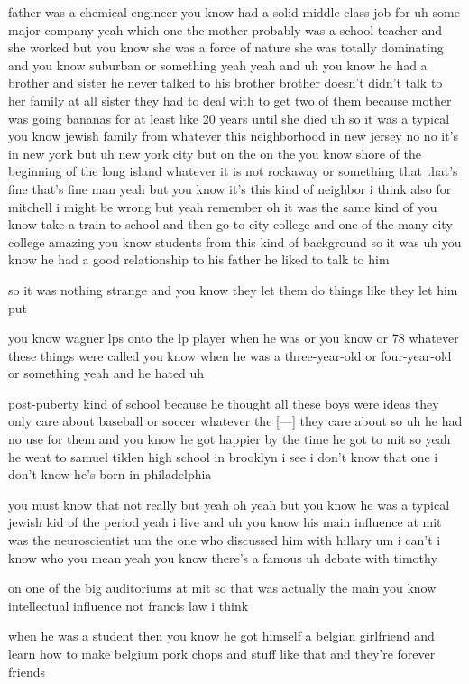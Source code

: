 \begin{description}
father was a chemical engineer you know had a solid middle class job for uh some major company yeah which one the mother probably was a school teacher and she worked but you know she was a force of nature she was totally dominating and you know suburban or something yeah yeah and uh you know he had a brother and sister he never talked to his brother brother doesn't didn't talk to her family at all sister they had to deal with to get two of them because mother was going bananas for at least like 20 years until she died uh so it was a typical you know jewish family from whatever this neighborhood in new jersey no no it's in new york but uh new york city but on the on the you know shore of the beginning of the long island whatever it is not rockaway or something that that's fine that's fine man yeah but you know it's this kind of neighbor i think also for mitchell i might be wrong but yeah remember oh it was the same kind of you know take a train to school and then go to city college and one of the many city college amazing you know students from this kind of background so it was uh you know he had a good relationship to his father he liked to talk to him

so it was nothing strange and you know they let them do things like they let him put

you know wagner lps onto the lp player when he was or you know or 78 whatever these things were called you know when he was a three-year-old or four-year-old or something yeah and he hated uh

post-puberty kind of school because he thought all these boys were ideas they only care about baseball or soccer whatever the [---] they care about so uh he had no use for them and you know he got happier by the time he got to mit so yeah he went to samuel tilden high school in brooklyn i see i don't know that one i don't know he's born in philadelphia

you must know that not really but yeah oh yeah but you know he was a typical jewish kid of the period yeah i live and uh you know his main influence at mit was the neuroscientist um the one who discussed him with hillary um i can't i know who you mean yeah you know there's a famous uh debate with timothy

on one of the big auditoriums at mit so that was actually the main you know intellectual influence not francis law i think

when he was a student then you know he got himself a belgian girlfriend and learn how to make belgium pork chops and stuff like that and they're forever friends


\end{description}
